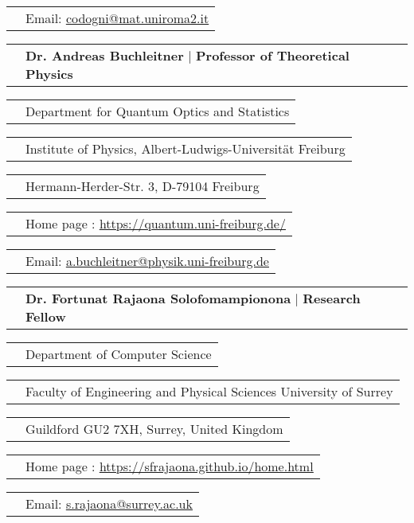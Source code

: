 \documentclass[11pt]{article}
\newcommand{\cvRefTitle}[2]{\begin{tabular}{>{\raggedleft\arraybackslash}p{3cm}>{\raggedright\arraybackslash}p{16cm}}
		 & \textbf{#1} $|$ \textbf{#2}  \\
\end{tabular}}
\newcommand{\cvRefEntry}[1]{\begin{tabular}{>{\raggedleft\arraybackslash}p{3cm}>{\raggedright\arraybackslash}p{16cm}}
		& #1 \\
\end{tabular}}
\begin{document}


\cvRefEntry{Email: \href{mailto:codogni@mat.uniroma2.it}{\color{blue}\underline{codogni@mat.uniroma2.it}}}

\vspace*{15pt}
\cvRefTitle{Dr. Andreas Buchleitner}{Professor of Theoretical Physics}

\cvRefEntry{Department for Quantum Optics and Statistics}

\cvRefEntry{Institute of Physics, Albert-Ludwigs-Universität Freiburg}

\cvRefEntry{Hermann-Herder-Str. 3, D-79104 Freiburg}

\cvRefEntry{Home page : \href{https://quantum.uni-freiburg.de/}{\color{blue}\underline{https://quantum.uni-freiburg.de/}}}



\cvRefEntry{Email: \href{mailto:a.buchleitner@physik.uni-freiburg.de}{\color{blue}\underline{a.buchleitner@physik.uni-freiburg.de}}}

\vspace*{15pt}
\cvRefTitle{Dr. Fortunat Rajaona Solofomampionona}{Research Fellow}

\cvRefEntry{Department of Computer Science}

\cvRefEntry{Faculty of Engineering and Physical Sciences University of Surrey
}

\cvRefEntry{Guildford GU2 7XH, Surrey, United Kingdom}

\cvRefEntry{Home page : \href{https://sfrajaona.github.io/home.html}{\color{blue}\underline{https://sfrajaona.github.io/home.html}}}



\cvRefEntry{Email: \href{mailto:s.rajaona@surrey.ac.uk}{\color{blue}\underline{s.rajaona@surrey.ac.uk}}}
\end{document}
